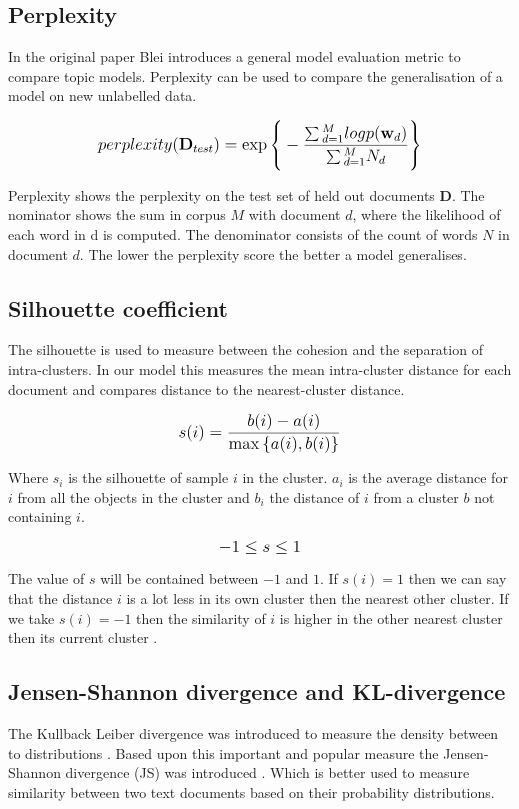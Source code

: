 \subsection{Perplexity}\label{methodology:perplexity}
In the original paper Blei introduces a general model evaluation metric \cite{Blei2003} to compare topic models. Perplexity can be used to compare the generalisation of a model on new unlabelled data.

\[
   \mathlarger{perplexity(\textbf{D}_{test}) = \exp{\Bigg \{ -\frac{\sum{}_{d=1}^{M}logp(\textbf{w}_d)}{\sum{}_{d=1}^{M}N_d} \Bigg \}}}
\]

Perplexity shows the perplexity on the test set of held out documents $\textbf{D}$. The nominator shows the sum in  corpus $M$ with document $d$, where the likelihood of each word in d is computed. The denominator consists of the count of words $N$ in document $d$.
The lower the perplexity score the better a model generalises. 


\subsection{Silhouette coefficient} \label{methodology:silhouette}
The silhouette is used to measure between the cohesion and the separation of intra-clusters. In our model this measures the mean intra-cluster distance for each document and compares distance to the nearest-cluster distance.

\[
   \mathlarger{s(i) = \frac{b(i) - a(i)}{\max{\{ a(i), b(i)}\} } }
\]

Where $s_i$ is the silhouette of sample $i$ in the cluster. $a_i$ is the average distance for $i$ from all the objects in the cluster and $b_i$ the distance of $i$ from a cluster $b$ not containing $i$. 

\[
\mathlarger{-1 \leq s \le 1}
\]

The value of $s$ will be contained between $-1$ and $1$. If $s(i) = 1$ then we can say that the distance $i$  is a lot less in its own cluster then the nearest other cluster. If we take $s(i) = -1$ then the similarity of $i$ is higher in the other nearest cluster then its current cluster \cite{Rousseeuw1987Silhouettes:Analysis}.


\subsection{Jensen-Shannon divergence and KL-divergence} \label{research:jsdivergence}
The Kullback Leiber divergence was introduced to measure the density between to distributions \cite{Hershey2007ApproximatingModels}. Based upon this important and popular measure the Jensen-Shannon divergence (JS) was introduced \cite{Fuglede2004Jensen-ShannonEmbedding}. Which is better used to measure similarity between two text documents based on their probability distributions.

